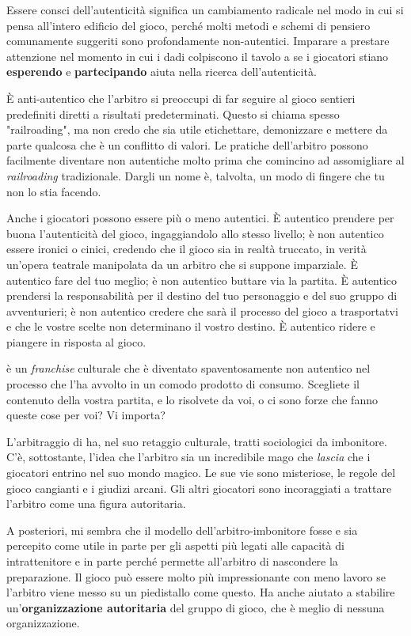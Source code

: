 Essere consci dell'autenticità significa un cambiamento radicale nel modo in cui si pensa all'intero edificio del gioco, perché molti metodi e schemi di pensiero comunamente suggeriti sono profondamente non-autentici. Imparare a prestare attenzione nel momento in cui i dadi colpiscono il tavolo a se i giocatori stiano \textbf{esperendo} e \textbf{partecipando} aiuta nella ricerca dell'autenticità.

È anti-autentico che l'arbitro si preoccupi di far seguire al gioco sentieri predefiniti diretti a risultati predeterminati. Questo si chiama spesso "railroading", ma non credo che sia utile etichettare, demonizzare e mettere da parte qualcosa che è un conflitto di valori. Le pratiche dell'arbitro possono facilmente diventare non autentiche molto prima che comincino ad assomigliare al \textit{railroading} tradizionale. Dargli un nome è, talvolta, un modo di fingere che tu non lo stia facendo.

Anche i giocatori possono essere più o meno autentici. È autentico prendere per buona l'autenticità del gioco, ingaggiandolo allo stesso livello; è non autentico essere ironici o cinici, credendo che il gioco sia in realtà truccato, in verità un'opera teatrale manipolata da un arbitro che si suppone imparziale. È autentico fare del tuo meglio; è non autentico buttare via la partita. È autentico prendersi la responsabilità per il destino del tuo personaggio e del suo gruppo di avventurieri; è non autentico credere che sarà il processo del gioco a trasportatvi e che le vostre scelte non determinano il vostro destino. È autentico ridere e piangere in risposta al gioco.

\dnd{} è un \textit{franchise} culturale che è diventato spaventosamente non autentico nel processo che l'ha avvolto in un comodo prodotto di consumo. Scegliete il contenuto della vostra partita, e lo risolvete da voi, o ci sono forze che fanno queste cose per voi? Vi importa?


L'arbitraggio di \dnd{} ha, nel suo retaggio culturale, tratti sociologici da imbonitore. C'è, sottostante, l'idea che l'arbitro sia un incredibile mago che \textit{lascia} che i giocatori entrino nel suo mondo magico. Le sue vie sono misteriose, le regole del gioco cangianti e i giudizi arcani. Gli altri giocatori sono incoraggiati a trattare l'arbitro come una figura autoritaria.

A posteriori, mi sembra che il modello dell'arbitro-imbonitore fosse e sia percepito come utile in parte per gli aspetti più legati alle capacità di intrattenitore e in parte perché permette all'arbitro di nascondere la preparazione. Il gioco può essere molto più impressionante con meno lavoro se l'arbitro viene messo su un piedistallo come questo. Ha anche aiutato a stabilire un'\textbf{organizzazione autoritaria} del gruppo di gioco, che è meglio di nessuna organizzazione.

